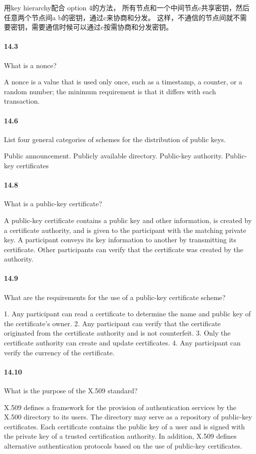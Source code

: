 \documentclass[UTF8]{article}
\begin{document}
用key hierarchy配合 option 4的方法， 所有节点和一个中间节点c共享密钥，然后任意两个节点间a b的密钥，通过c来协商和分发。 这样，不通信的节点间就不需要密钥，需要通信时候可以通过c按需协商和分发密钥。
\paragraph{14.3}
What is a nonce?

A nonce is a value that is used only once, such as a timestamp, a counter, or a random number; the minimum requirement is that it differs with each transaction.
\paragraph{14.6}
List four general categories of schemes for the distribution of public keys.

Public announcement. Publicly available directory. Public-key authority. Public-key certificates
\paragraph{14.8}
What is a public-key certificate?

A public-key certificate contains a public key and other information, is created by a certificate authority, and is given to the participant with the matching private key. A participant conveys its key information to another by transmitting its certificate. Other participants can verify that the certificate was created by the authority.
\paragraph{14.9}
What are the requirements for the use of a public-key certificate scheme?

1. Any participant can read a certificate to determine the name and public key of the certificate's owner. 2. Any participant can verify that the certificate originated from the certificate authority and is not counterfeit. 3. Only the certificate authority can create and update certificates. 4. Any participant can verify the currency of the certificate.
\paragraph{14.10}
What is the purpose of the X.509 standard?

X.509 defines a framework for the provision of authentication services by the X.500 directory to its users. The directory may serve as a repository of public-key certificates. Each certificate contains the public key of a user and is signed with the private key of a trusted certification authority. In addition, X.509 defines alternative authentication protocols based on the use of public-key certificates.
\end{document}

